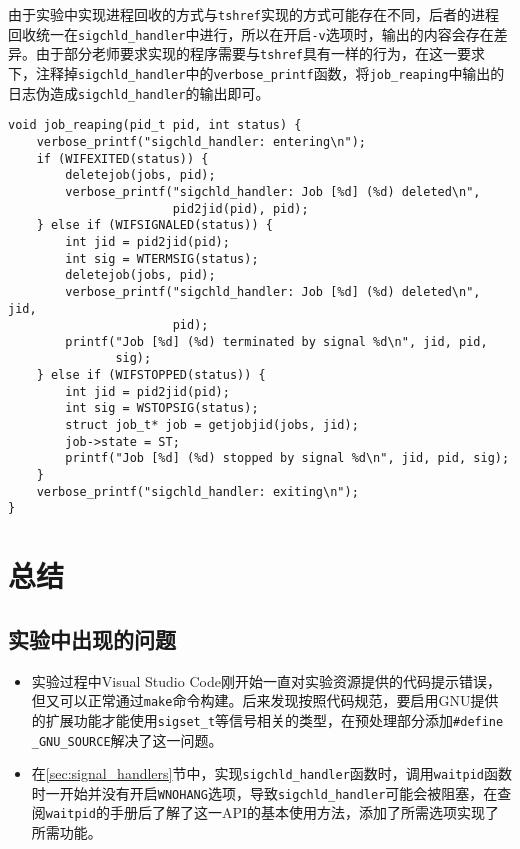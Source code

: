\documentclass[a4paper, 11pt]{ctexart}
\let\oldsection\section
\renewcommand{\section}{\clearpage\oldsection}
\begin{document}
由于实验中实现进程回收的方式与\texttt{tshref}实现的方式可能存在不同，后者的进程回收统一在\texttt{sigchld\_handler}中进行，所以在开启\texttt{-v}选项时，输出的内容会存在差异。由于部分老师要求实现的程序需要与\texttt{tshref}具有一样的行为，在这一要求下，注释掉\texttt{sigchld\_handler}中的\texttt{verbose\_printf}函数，将\texttt{job\_reaping}中输出的日志伪造成\texttt{sigchld\_handler}的输出即可。

\begin{verbatim}
void job_reaping(pid_t pid, int status) {
    verbose_printf("sigchld_handler: entering\n");
    if (WIFEXITED(status)) {
        deletejob(jobs, pid);
        verbose_printf("sigchld_handler: Job [%d] (%d) deleted\n",
                       pid2jid(pid), pid);
    } else if (WIFSIGNALED(status)) {
        int jid = pid2jid(pid);
        int sig = WTERMSIG(status);
        deletejob(jobs, pid);
        verbose_printf("sigchld_handler: Job [%d] (%d) deleted\n", jid,
                       pid);
        printf("Job [%d] (%d) terminated by signal %d\n", jid, pid,
               sig);
    } else if (WIFSTOPPED(status)) {
        int jid = pid2jid(pid);
        int sig = WSTOPSIG(status);
        struct job_t* job = getjobjid(jobs, jid);
        job->state = ST;
        printf("Job [%d] (%d) stopped by signal %d\n", jid, pid, sig);
    }
    verbose_printf("sigchld_handler: exiting\n");
}
\end{verbatim}

\section{总结}
\subsection{实验中出现的问题}

\begin{itemize}
    \item 实验过程中Visual Studio Code刚开始一直对实验资源提供的代码提示错误，但又可以正常通过\texttt{make}命令构建。后来发现按照代码规范，要启用GNU提供的扩展功能才能使用\texttt{sigset\_t}等信号相关的类型，在预处理部分添加\texttt{\#define \_GNU\_SOURCE}解决了这一问题。
    \item 在\ref{sec:signal_handlers}节中，实现\texttt{sigchld\_handler}函数时，调用\texttt{waitpid}函数时一开始并没有开启\texttt{WNOHANG}选项，导致\texttt{sigchld\_handler}可能会被阻塞，在查阅\texttt{waitpid}的手册后了解了这一API的基本使用方法，添加了所需选项实现了所需功能。
\end{itemize}
\end{document}
